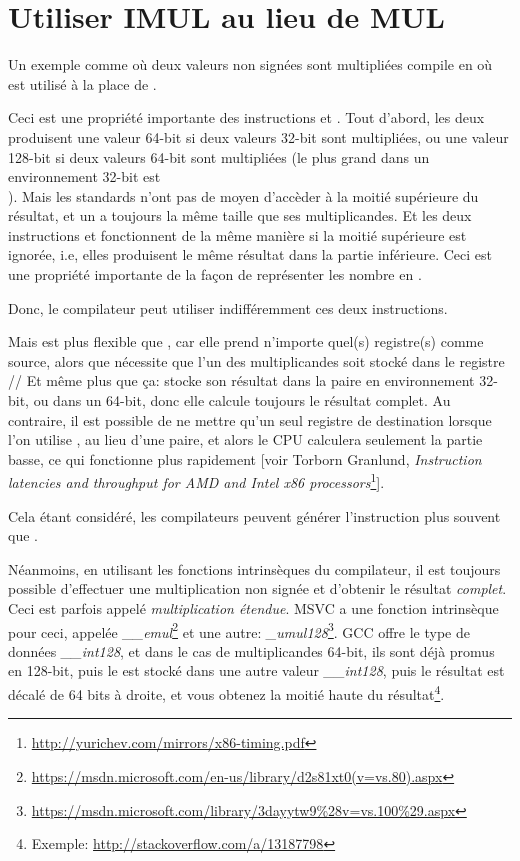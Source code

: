 \section{Utiliser IMUL au lieu de MUL}
\label{IMUL_over_MUL}

Un exemple comme  où deux valeurs non signées sont multipliées
compile en  où \IMUL est utilisé à la place de \MUL.

Ceci est une propriété importante des instructions \MUL et \IMUL.
Tout d'abord, les deux produisent une valeur 64-bit si deux valeurs 32-bit sont multipliées,
ou une valeur 128-bit si deux valeurs 64-bit sont multipliées (le plus grand 
dans un environnement 32-bit est \\
).
Mais les standards \CCpp n'ont pas de moyen d'accèder à la moitié supérieure du résultat,
et un  a toujours la même taille que ses multiplicandes.
Et les deux instructions \MUL et \IMUL fonctionnent de la même manière si la moitié
supérieure est ignorée, i.e, elles produisent le même résultat dans la partie inférieure.
Ceci est une propriété importante de la façon de représenter les nombre en .

Donc, le compilateur \CCpp peut utiliser indifféremment ces deux instructions.

Mais \IMUL est plus flexible que \MUL, car elle prend n'importe quel(s) registre(s) comme
source, alors que \MUL nécessite que l'un des multiplicandes soit stocké dans le
registre \AX/\EAX/\RAX
Et même plus que ça: \MUL stocke son résultat dans la paire  en environnement
32-bit, ou  dans un 64-bit, donc elle calcule toujours le résultat complet.
Au contraire, il est possible de ne mettre qu'un seul registre de destination lorsque
l'on utilise \IMUL, au lieu d'une paire, et alors le \ac{CPU} calculera seulement
la partie basse, ce qui fonctionne plus rapidement [voir Torborn Granlund,
\emph{Instruction latencies and throughput for AMD and Intel x86 processors}\footnote{\url{http://yurichev.com/mirrors/x86-timing.pdf}}].

Cela étant considéré, les compilateurs \CCpp peuvent générer l'instruction \IMUL
plus souvent que \MUL.

Néanmoins, en utilisant les fonctions intrinsèques du compilateur, il est toujours
possible d'effectuer une multiplication non signée et d'obtenir le résultat \emph{complet}.
Ceci est parfois appelé \emph{multiplication étendue}.
MSVC a une fonction intrinsèque pour ceci, appelée \emph{\_\_emul}\footnote{\url{https://msdn.microsoft.com/en-us/library/d2s81xt0(v=vs.80).aspx}}
et une autre: \emph{\_umul128}\footnote{\url{https://msdn.microsoft.com/library/3dayytw9%28v=vs.100%29.aspx}}.
GCC offre le type de données \emph{\_\_int128}, et dans le cas de multiplicandes 64-bit,
ils sont déjà promus en 128-bit, puis le  est stocké dans
une autre valeur \emph{\_\_int128}, puis le résultat est décalé de 64 bits à droite,
et vous obtenez la moitié haute du résultat\footnote{Exemple: \url{http://stackoverflow.com/a/13187798}}.

